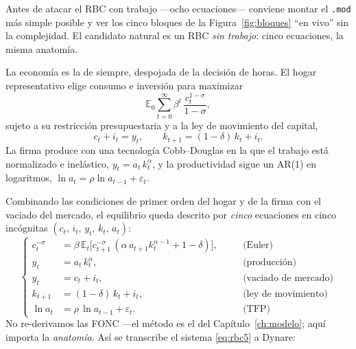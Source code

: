 \documentclass[11pt,a4paper]{report}
\newcommand{\code}[1]{\texttt{#1}}
\newcommand{\E}{\mathbb{E}}
\begin{document}
Antes de atacar el RBC con trabajo ---ocho ecuaciones--- conviene montar el
\code{.mod} más simple posible y ver los cinco bloques de la Figura~\ref{fig:bloques} ``en vivo'' sin la
complejidad. El candidato natural es un RBC \emph{sin trabajo}: cinco ecuaciones,
la misma anatomía.

La economía es la de siempre, despojada de la decisión de horas. El hogar
representativo elige consumo e inversión para maximizar
\[
  \E_0 \sum_{t=0}^{\infty} \beta^t\,\frac{c_t^{1-\sigma}}{1-\sigma},
\]
sujeto a su restricción presupuestaria y a la ley de movimiento del capital,
\[
  c_t + i_t = y_t, \qquad k_{t+1} = (1-\delta)\,k_t + i_t .
\]
La firma produce con una tecnología Cobb--Douglas en la que el trabajo está
normalizado e inelástico, $y_t = a_t\,k_t^{\alpha}$, y la productividad sigue un
AR(1) en logaritmos, $\ln a_t = \rho\ln a_{t-1}+\varepsilon_t$.

Combinando las condiciones de primer orden del hogar y de la firma con el
vaciado del mercado, el equilibrio queda descrito por \emph{cinco} ecuaciones
en cinco incógnitas $(c_t,\,i_t,\,y_t,\,k_t,\,a_t)$:
\begin{equation}
\left\{
\begin{aligned}
  c_t^{-\sigma} &= \beta\,\E_t\!\big[c_{t+1}^{-\sigma}\,(\alpha\,a_{t+1} k_t^{\alpha-1}+1-\delta)\big], &&\quad\text{(Euler)}\\[2pt]
  y_t &= a_t\,k_t^{\alpha}, &&\quad\text{(producción)}\\[2pt]
  y_t &= c_t + i_t, &&\quad\text{(vaciado de mercado)}\\[2pt]
  k_{t+1} &= (1-\delta)\,k_t + i_t, &&\quad\text{(ley de movimiento)}\\[2pt]
  \ln a_t &= \rho\,\ln a_{t-1} + \varepsilon_t. &&\quad\text{(TFP)}
\end{aligned}
\right.
\label{eq:rbc5}
\end{equation}
No re-derivamos las FONC ---el método es el del Capítulo~\ref{ch:modelo}; aquí
importa la \emph{anatomía}. Así se transcribe el sistema \eqref{eq:rbc5} a Dynare:
\end{document}
